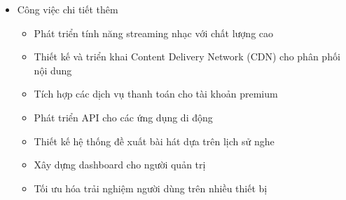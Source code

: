 \begin{itemize}
    \item Công việc chi tiết thêm
    \begin{itemize}
        \item Phát triển tính năng streaming nhạc với chất lượng cao
        \item Thiết kế và triển khai Content Delivery Network (CDN) cho phân phối nội dung
        \item Tích hợp các dịch vụ thanh toán cho tài khoản premium
        \item Phát triển API cho các ứng dụng di động
        \item Thiết kế hệ thống đề xuất bài hát dựa trên lịch sử nghe
        \item Xây dựng dashboard cho người quản trị
        \item Tối ưu hóa trải nghiệm người dùng trên nhiều thiết bị
    \end{itemize}
\end{itemize}

